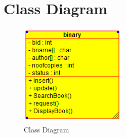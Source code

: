 \documentclass[10pt,a4paper]{article}
\begin{document}
\newpage
\section{Class Diagram}
\begin{figure}[htb!]
		\centering
		\includegraphics[scale = 0.80]{bst-class}
		\caption{Class Diagram}
		\label{Class Diagram}
		\end{figure}
\end{document}
